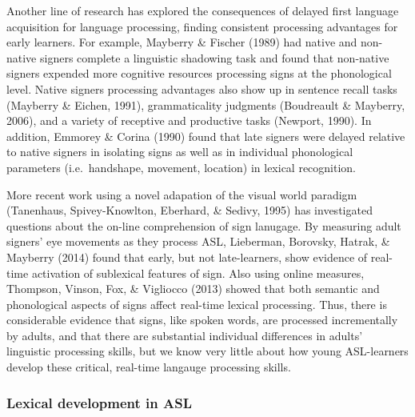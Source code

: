 \documentclass[12pt,]{article}
\begin{document}
Another line of research has explored the consequences of delayed first
language acquisition for language processing, finding consistent
processing advantages for early learners. For example, Mayberry \&
Fischer (1989) had native and non-native signers complete a linguistic
shadowing task and found that non-native signers expended more cognitive
resources processing signs at the phonological level. Native signers
processing advantages also show up in sentence recall tasks (Mayberry \&
Eichen, 1991), grammaticality judgments (Boudreault \& Mayberry, 2006),
and a variety of receptive and productive tasks (Newport, 1990). In
addition, Emmorey \& Corina (1990) found that late signers were delayed
relative to native signers in isolating signs as well as in individual
phonological parameters (i.e.~handshape, movement, location) in lexical
recognition.

More recent work using a novel adapation of the visual world paradigm
(Tanenhaus, Spivey-Knowlton, Eberhard, \& Sedivy, 1995) has investigated
questions about the on-line comprehension of sign lanugage. By measuring
adult signers' eye movements as they process ASL, Lieberman, Borovsky,
Hatrak, \& Mayberry (2014) found that early, but not late-learners, show
evidence of real-time activation of sublexical features of sign. Also
using online measures, Thompson, Vinson, Fox, \& Vigliocco (2013) showed
that both semantic and phonological aspects of signs affect real-time
lexical processing. Thus, there is considerable evidence that signs,
like spoken words, are processed incrementally by adults, and that there
are substantial individual differences in adults' linguistic processing
skills, but we know very little about how young ASL-learners develop
these critical, real-time langauge processing skills.

\subsubsection{Lexical development in
ASL}\label{lexical-development-in-asl}
\end{document}
